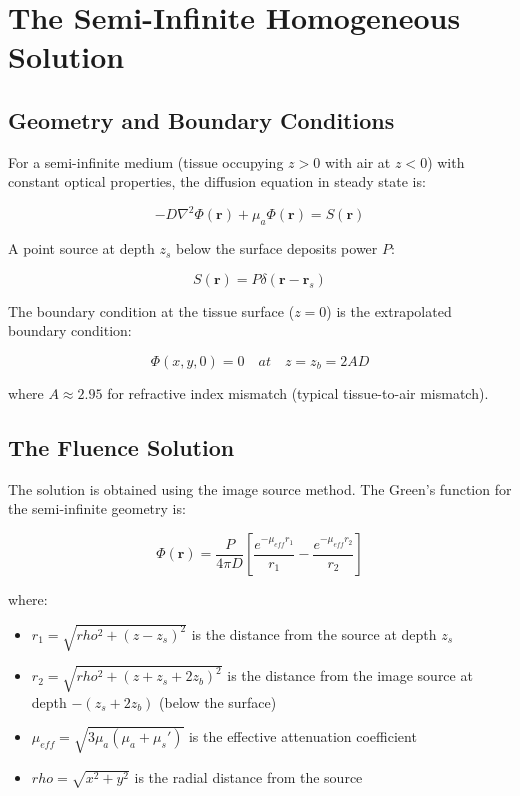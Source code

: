 \documentclass[12pt]{article}
\def\rho{rho}%
\def\mathrm#1{#1}%
\def\text#1{#1}%
\def\,{ }%
\begin{document}
\section{The Semi-Infinite Homogeneous Solution}

\subsection{Geometry and Boundary Conditions}

For a semi-infinite medium (tissue occupying $z > 0$ with air at $z < 0$) with constant optical properties, the diffusion equation in steady state is:

\begin{equation}
-D \nabla^2 \Phi(\mathbf{r}) + \mu_a \Phi(\mathbf{r}) = S(\mathbf{r})
\end{equation}

A point source at depth $z_s$ below the surface deposits power $P$:

\begin{equation}
S(\mathbf{r}) = P \, \delta(\mathbf{r} - \mathbf{r}_s)
\end{equation}

The boundary condition at the tissue surface ($z = 0$) is the extrapolated boundary condition:

\begin{equation}
\Phi(x, y, 0) = 0 \quad \text{at} \quad z = z_b = 2 A D
\end{equation}

where $A \approx 2.95$ for refractive index mismatch (typical tissue-to-air mismatch).

\subsection{The Fluence Solution}

The solution is obtained using the image source method. The Green's function for the semi-infinite geometry is:

\begin{equation}
\Phi(\mathbf{r}) = \frac{P}{4\pi D} \left[ \frac{e^{-\mu_{\mathrm{eff}} r_1}}{r_1} - \frac{e^{-\mu_{\mathrm{eff}} r_2}}{r_2} \right]
\label{eq:fluence_semiinf}
\end{equation}

where:
\begin{itemize}
\item $r_1 = \sqrt{\rho^2 + (z - z_s)^2}$ is the distance from the source at depth $z_s$
\item $r_2 = \sqrt{\rho^2 + (z + z_s + 2z_b)^2}$ is the distance from the image source at depth $-(z_s + 2z_b)$ (below the surface)
\item $\mu_{\mathrm{eff}} = \sqrt{3 \mu_a (\mu_a + \mu_s')}$ is the effective attenuation coefficient
\item $\rho = \sqrt{x^2 + y^2}$ is the radial distance from the source
\end{itemize}
\end{document}
